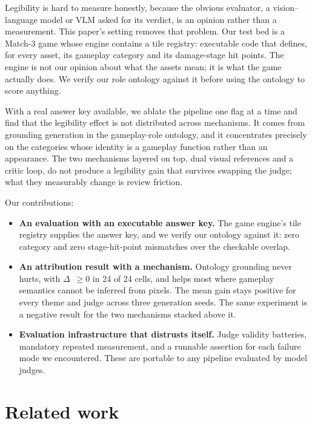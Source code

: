 \documentclass{article}
\newcommand{\D}{\ensuremath{\Delta}}
\begin{document}
Legibility is hard to measure honestly, because the obvious evaluator, a vision--language
model or VLM asked for its verdict, is an opinion rather than a measurement. This paper's setting
removes
that problem. Our test bed is
a Match-3 game whose engine contains a tile registry: executable code that defines, for every
asset, its gameplay category and its damage-stage hit points. The engine is not our opinion about
what the assets mean; it is what the game actually does. We verify our role ontology against it
before using the ontology to score anything.

With a real answer key available, we ablate the pipeline one flag at a time and find that the
legibility effect is not distributed across mechanisms. It comes from grounding generation in the
gameplay-role ontology, and it concentrates precisely on the categories whose identity is a gameplay
function rather than an appearance. The two mechanisms layered on top, dual visual references and a
critic loop, do not produce a legibility gain that survives swapping the judge; what they measurably
change is review friction.

Our contributions:

\begin{itemize}[leftmargin=*,itemsep=2pt]
  \item \textbf{An evaluation with an executable answer key.} The game engine's tile registry
    supplies the
    answer key, and we verify our ontology against it: zero category and zero stage-hit-point
    mismatches over the checkable overlap.
  \item \textbf{An attribution result with a mechanism.} Ontology grounding never hurts,
    with \D~$\geq 0$ in 24 of 24 cells, and helps most where gameplay semantics cannot be inferred
    from pixels. The mean gain stays positive for every theme and judge across three generation
    seeds. The same experiment
    is a negative result for the two mechanisms stacked above it.
  \item \textbf{Evaluation infrastructure that distrusts itself.} Judge validity batteries,
    mandatory repeated measurement, and a runnable assertion for each failure mode we encountered.
    These are portable to any pipeline evaluated by model judges.
\end{itemize}

\section{Related work}
\label{sec:related}
\end{document}
